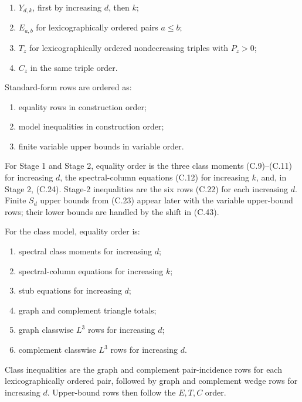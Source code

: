 \documentclass[
  english,
  11pt,
  a4paper,
]{article}
\providecommand{\tightlist}{%
  \setlength{\itemsep}{0pt}\setlength{\parskip}{0pt}}
\begin{document}
\begin{enumerate}
\def\labelenumi{\arabic{enumi}.}
\tightlist
\item
  \(Y_{d,k}\), first by increasing \(d\), then \(k\);
\item
  \(E_{a,b}\) for lexicographically ordered pairs \(a\le b\);
\item
  \(T_z\) for lexicographically ordered nondecreasing triples with
  \(P_z>0\);
\item
  \(C_z\) in the same triple order.
\end{enumerate}

Standard-form rows are ordered as:

\begin{enumerate}
\def\labelenumi{\arabic{enumi}.}
\tightlist
\item
  equality rows in construction order;
\item
  model inequalities in construction order;
\item
  finite variable upper bounds in variable order.
\end{enumerate}

For Stage 1 and Stage 2, equality order is the three class moments
(C.9)--(C.11) for increasing \(d\), the spectral-column equations (C.12)
for increasing \(k\), and, in Stage 2, (C.24). Stage-2 inequalities are
the six rows (C.22) for each increasing \(d\). Finite \(S_d\) upper
bounds from (C.23) appear later with the variable upper-bound rows;
their lower bounds are handled by the shift in (C.43).

For the class model, equality order is:

\begin{enumerate}
\def\labelenumi{\arabic{enumi}.}
\tightlist
\item
  spectral class moments for increasing \(d\);
\item
  spectral-column equations for increasing \(k\);
\item
  stub equations for increasing \(d\);
\item
  graph and complement triangle totals;
\item
  graph classwise \(L^3\) rows for increasing \(d\);
\item
  complement classwise \(L^3\) rows for increasing \(d\).
\end{enumerate}

Class inequalities are the graph and complement pair-incidence rows for
each lexicographically ordered pair, followed by graph and complement
wedge rows for increasing \(d\). Upper-bound rows then follow the
\(E,T,C\) order.
\end{document}
